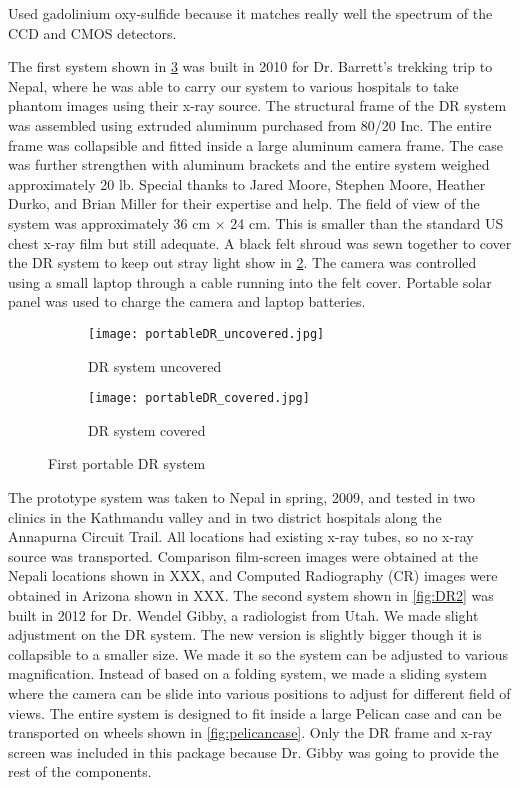 Used gadolinium oxy-sulfide because it matches really well the spectrum of the CCD and CMOS detectors.

The first system shown in \ref{fig:DR1} was built in 2010 for Dr. Barrett's trekking trip to Nepal, where he was able to carry our system to various hospitals to take phantom images using their x-ray source. The structural frame of the DR system was assembled using extruded aluminum purchased from 80/20 Inc.  The entire frame was collapsible and fitted inside a large aluminum camera frame.  The case was further strengthen with aluminum brackets and the entire system weighed approximately 20 lb.  Special thanks to Jared Moore, Stephen Moore, Heather Durko, and Brian Miller for their expertise and help.  The field of view of the system was approximately 36 cm $\times$ 24 cm.  This is smaller than the standard US chest x-ray film but still adequate.  A black felt shroud was sewn together to cover the DR system to keep out stray light show in \ref{fig:DR1covered}.  The camera was controlled using a small laptop through a cable running into the felt cover.  Portable solar panel was used to charge the camera and laptop batteries.

\begin{figure}[ht]
\centering
	\begin{subfigure}[b]{0.4\linewidth}
	\texttt{[image: portableDR\_uncovered.jpg]}
	\caption{DR system uncovered}
	\label{fig:DR1uncovered}
	\end{subfigure}
\hspace{0.2cm}
	\begin{subfigure}[b]{0.4\linewidth}
	\centering
	\texttt{[image: portableDR\_covered.jpg]}
	\caption{DR system covered}
	\label{fig:DR1covered}
	\end{subfigure}
\caption{First portable DR system}
\label{fig:DR1}
\end{figure}

The prototype system was taken to Nepal in spring, 2009, and tested in two clinics in the Kathmandu valley and in two district hospitals along the Annapurna Circuit Trail.  All locations had existing x-ray tubes, so no x-ray source was transported. Comparison film-screen images were obtained at the Nepali locations shown in XXX, and Computed Radiography (CR) images were obtained in Arizona shown in XXX.
The second system shown in \ref{fig:DR2} was built in 2012 for Dr. Wendel Gibby, a radiologist from Utah.  We made slight adjustment on the DR system.  The new version is slightly bigger though it is collapsible to a smaller size.  We made it so the system can be adjusted to various magnification.  Instead of based on a folding system, we made a sliding system where the camera can be slide into various positions to adjust for different field of views.  The entire system is designed to fit inside a large Pelican case and can be transported on wheels shown in \ref{fig:pelicancase}.  Only the DR frame and x-ray screen was included in this package because Dr. Gibby was going to provide the rest of the components.  

